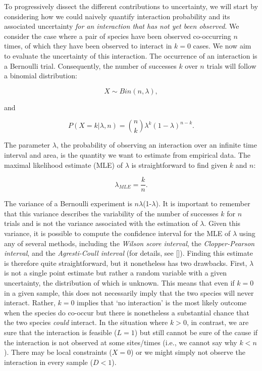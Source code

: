 \documentclass[12pt]{article}
\begin{document}
\begin{spacing}{2.0}
  To progressively dissect the different contributions to uncertainty, we will start by considering how we could naively quantify interaction probability and its associated uncertainty \emph{for an interaction that has not yet been observed}. We consider the case where a pair of species have been observed co-occurring $n$ times, of which they have been observed to interact in $k = 0$ cases. We now aim to evaluate the uncertainty of this interaction. The occurrence of an interaction is a Bernoulli trial. Consequently, the number of successes $k$ over $n$ trials will follow a binomial distribution: 
      
      \begin{equation}
        X \sim Bin(n,\lambda) ,
      \end{equation}

      \noindent and 

      \begin{equation}
         P(X = k|\lambda,n) = {n \choose k}\lambda^k(1-\lambda)^{n-k} . 
         \label{likelihood}
      \end{equation}

  \noindent The parameter $\lambda$, the probability of observing an interaction over an infinite time interval and area, is the quantity we want to estimate from empirical data. 
  The maximal likelihood estimate (MLE) of $\lambda$ is straightforward to find given $k$ and $n$:

      \begin{equation}
        \lambda_{MLE} = \frac{k}{n}  .
        \label{theta_MLE}
      \end{equation}

  The variance of a Bernoulli experiment is $n\lambda$(1-$\lambda$). It is important to remember that this variance describes the variability of the number of successes $k$ for $n$ trials and is not the variance associated with the estimation of $\lambda$. Given this variance, it is possible to compute the confidence interval for the MLE of $\lambda$ using any of several methods, including the \emph{Wilson score interval}, the \emph{Clopper-Pearson interval}, and the \emph{Agresti-Coull interval} (for details, see [\citealp{Brown2001}]). Finding this estimate is therefore quite straightforward, but it nonetheless has two drawbacks. First, $\lambda$ is not a single point estimate but rather a random variable with a given uncertainty, the distribution of which is unknown. This means that even if $k = 0$ in a given sample, this does not necessarily imply that the two species will never interact. Rather, $k = 0$ implies that `no interaction' is the most likely outcome when the species do co-occur but there is nonetheless a substantial chance that the two species \emph{could} interact. In the situation where $k>0$, in contrast, we are sure that the interaction is feasible ($L = 1$) but still cannot be sure of the cause if the interaction is not observed at some sites/times (i.e., we cannot say why $k<n$). There may be local constraints ($X=0$) or we might simply not observe the interaction in every sample ($D<1$). 



\end{spacing}
\end{document}
